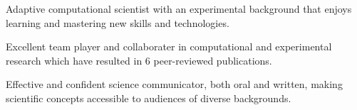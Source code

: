 

\begin{cventries}
\vspace{-4.0mm}

  \cventry
    {} %
    {} %
    {} %
    {} %
    {
      \begin{cvitems} %
        \item {Adaptive computational scientist with an experimental background that enjoys learning and mastering new skills and technologies.}
        \vspace{1.0mm}
        \item {Excellent team player and collaborater in computational and experimental research which have resulted in 6 peer-reviewed publications.}
        \vspace{1.0mm}
        \item {Effective and confident science communicator, both oral and written, making scientific concepts accessible to audiences of diverse backgrounds.}
      \end{cvitems}
    }
\vspace{-4.0mm}
\end{cventries}
